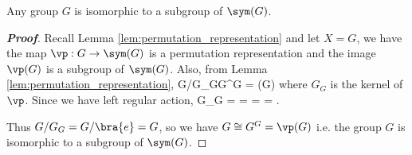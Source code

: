 




\begin{theorem}\label{thm:cayley}
Any group $G$ is isomorphic to a subgroup of $\sym (G)$.
\end{theorem}

\begin{proof}[\bf Proof]
Recall Lemma \ref{lem:permutation_representation} and let $X=G$, we have the map $\vp: G\to \sym (G)$ is a permutation representation and the image $\vp(G)$ is a subgroup of $\sym (G)$. Also, from Lemma \ref{lem:permutation_representation},
\be
G/G_G\cong G^G = \vp(G)
\ee
where $G_G$ is the kernel of $\vp$. Since we have left regular action,
\be
G_G =  =  =  = .
\ee

Thus $G/G_G = G/\bra{e} = G$, so we have $G \cong G^G = \vp(G)$ i.e. the group $G$ is isomorphic to a subgroup of $\sym (G)$.
\end{proof}


